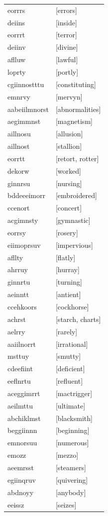 \documentclass{article}
\begin{document}
\begin{tabular}{ll}
eorrrs & [errors] \\
deiins & [inside] \\
eorrrt & [terror] \\
deiinv & [divine] \\
aflluw & [lawful] \\
loprty & [portly] \\
cgiinnostttu & [constituting] \\
emnrvy & [mervyn] \\
aabeiilmnorst & [abnormalities] \\
aegimmnst & [magnetism] \\
aillnosu & [allusion] \\
aillnost & [stallion] \\
eorrtt & [retort, rotter] \\
dekorw & [worked] \\
ginnrsu & [nursing] \\
bddeeeimorr & [embroidered] \\
ccenort & [concert] \\
acgimnsty & [gymnastic] \\
eorrsy & [rosery] \\
eiimoprsuv & [impervious] \\
afllty & [flatly] \\
ahrruy & [hurray] \\
ginnrtu & [turning] \\
aeinntt & [antient] \\
ccehkoors & [cockhorse] \\
achrst & [starch, charts] \\
aelrry & [rarely] \\
aaiilnorrt & [irrational] \\
msttuy & [smutty] \\
cdeefiint & [deficient] \\
eeflnrtu & [refluent] \\
aceggimrrt & [mactrigger] \\
aeilmttu & [ultimate] \\
abchiklmst & [blacksmith] \\
beggiinnn & [beginning] \\
emnorsuu & [numerous] \\
emozz & [mezzo] \\
aeemrsst & [steamers] \\
egiinqruv & [quivering] \\
abdnoyy & [anybody] \\
eeissz & [seizes] \\

\end{tabular}
\end{document}
